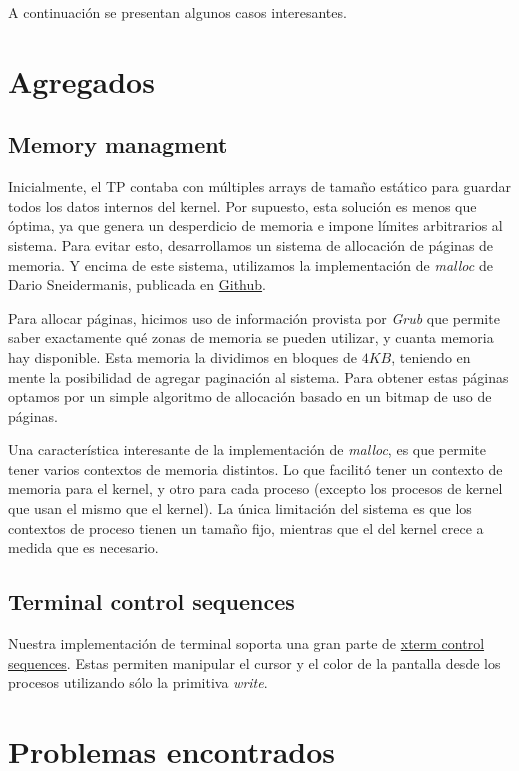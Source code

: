 \documentclass[a4paper,10pt]{article}
\begin{document}
A continuación se presentan algunos casos interesantes.

\newpage
\section{Agregados}
\subsection{Memory managment}
Inicialmente, el TP contaba con múltiples arrays de tamaño estático para guardar todos los datos internos del kernel.
Por supuesto, esta solución es menos que óptima, ya que genera un desperdicio de memoria e impone límites arbitrarios al sistema.
Para evitar esto, desarrollamos un sistema de allocación de páginas de memoria.
Y encima de este sistema, utilizamos la implementación de \textit{malloc} de Dario Sneidermanis, publicada en \href{https://github.com/esneider/malloc}{Github}.

Para allocar páginas, hicimos uso de información provista por \textit{Grub} que permite saber exactamente qué zonas de memoria se pueden utilizar, 
y cuanta memoria hay disponible.
Esta memoria la dividimos en bloques de $4KB$, teniendo en mente la posibilidad de agregar paginación al sistema.
Para obtener estas páginas optamos por un simple algoritmo de allocación basado en un bitmap de uso de páginas.

Una característica interesante de la implementación de \textit{malloc}, es que permite tener varios contextos de memoria distintos.
Lo que facilitó tener un contexto de memoria para el kernel, y otro para cada proceso (excepto los procesos de kernel que usan el mismo que el kernel).
La única limitación del sistema es que los contextos de proceso tienen un tamaño fijo, mientras que el del kernel crece a medida que es necesario.

\subsection{Terminal control sequences}
Nuestra implementación de terminal soporta una gran parte de \href{http://invisible-island.net/xterm/ctlseqs/ctlseqs.html}{xterm control sequences}.
Estas permiten manipular el cursor y el color de la pantalla desde los procesos utilizando sólo la primitiva \textit{write}.

\newpage
\section{Problemas encontrados}
\end{document}
